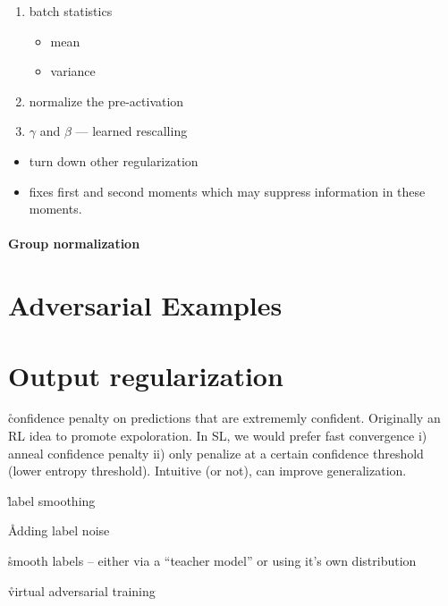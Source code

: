 \begin{enumerate}[noitemsep,topsep=0pt]
	\item batch statistics
	\begin{itemize}[noitemsep,topsep=0pt]
		\item mean
		\item variance
	\end{itemize}
	\item normalize the pre-activation
	\item $\gamma$ and $\beta$ --- learned rescalling
\end{enumerate}


\begin{itemize}[noitemsep,topsep=0pt]
	\item turn down other regularization
	\item fixes first and second moments which may suppress information in these moments.
\end{itemize}



\paragraph{Group normalization}


\section{Adversarial Examples}



\section{Output regularization}

\r{confidence penalty on predictions that are extrememly confident\cite{pereyra2017regularizing}. Originally an RL idea to promote expoloration. In SL, we would prefer fast convergence i) anneal confidence penalty ii) only penalize at a certain confidence threshold (lower entropy threshold). Intuitive (or not), can improve generalization.}

\r{label smoothing\cite{szegedy2016rethinking}}

\r{Adding label noise\cite{xie2016disturblabel}}

\r{smooth labels -- either via a ``teacher model''\cite{hinton2015distilling} or using it's own distribution\cite{reed2014training}}


\r{virtual adversarial training\cite{miyato2018virtual}}